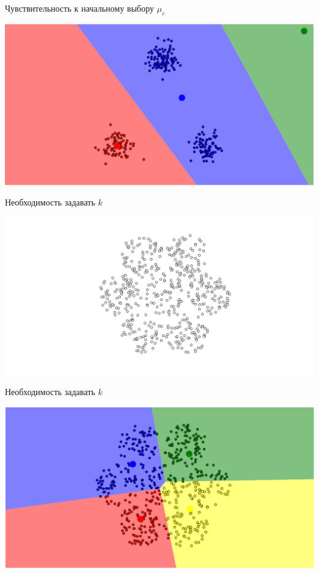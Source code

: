 \documentclass[10pt]{beamer}
\begin{document}
\begin{frame}{Чувствительность к начальному выбору $\mu_c$}
	\begin{center}
	  \includegraphics[width= \textwidth, keepaspectratio = true]{images/localmin4}  
	\end{center}
\end{frame}

\begin{frame}{Необходимость задавать $k$}
	\begin{center}
	  \includegraphics[width= \textwidth, keepaspectratio = true]{images/k_means_k}  
	\end{center}
\end{frame}

\begin{frame}{Необходимость задавать $k$}
	\begin{center}
	  \includegraphics[width= \textwidth, keepaspectratio = true]{images/k_means_k4}  
	\end{center}
\end{frame}
\end{document}
